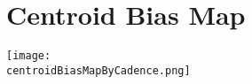 % 
% 
% 
%
%

\section{Centroid Bias Map}

\ifdefined \centroidBiasMapByCadence

\begin{center}
  \texttt{[image: \\centroidBiasMapByCadence.png]}
\end{center}

